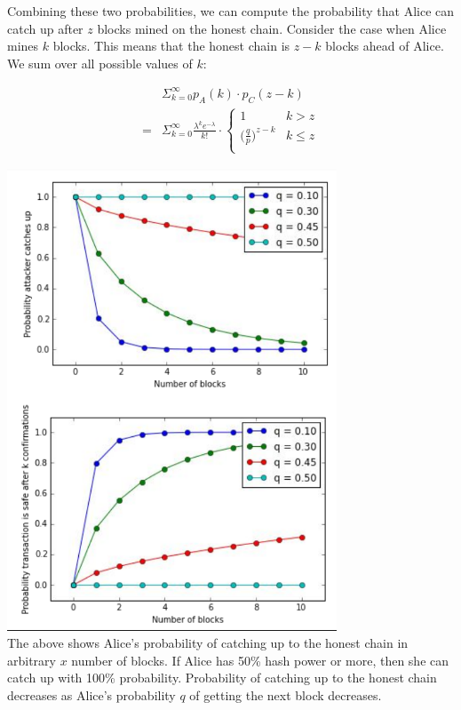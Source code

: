 \documentclass[full.tex]{subfiles}
\begin{document}
   Combining these two probabilities, we can compute the probability that Alice can catch up after $z$ blocks mined on the honest chain. Consider the case when Alice mines $k$ blocks. This means that the honest chain is $z-k$ blocks ahead of Alice. We sum over all possible values of $k$:
   
   \begin{equation*}
       \begin{split}
           &\Sigma_{k=0}^\infty p_A(k) \cdot p_C(z-k) \\
           = &\Sigma_{k=0}^\infty \frac{\lambda^k e^{-\lambda}}{k!} \cdot  \left\{
    \begin{array}{ll}
      1  & k > z \\ 
      \big(\frac{q}{p}\big)^{z-k} & k \leq z \\
    \end{array}
  \right.
       \end{split}
   \end{equation*}
   
      \includegraphics[scale=1]{doublespend_plots} \\
   
    The above shows Alice's probability of catching up to the honest chain in arbitrary $x$ number of blocks. If Alice has 50\% hash power or more, then she can catch up with 100\% probability. Probability of catching up to the honest chain decreases as Alice's probability $q$ of getting the next block decreases.
    
\end{document}
